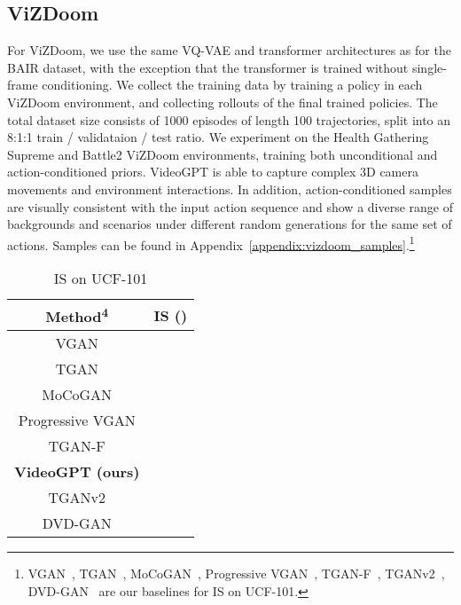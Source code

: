 \documentclass{article}
\begin{document}
\subsection{ViZDoom}
For ViZDoom, we use the same VQ-VAE and transformer architectures as for the BAIR dataset, with the exception that the transformer is trained without single-frame conditioning. We collect the training data by training a policy in each ViZDoom environment, and collecting rollouts of the final trained policies. The total dataset size consists of 1000 episodes of length 100 trajectories, split into an 8:1:1 train / validataion / test ratio. We experiment on the Health Gathering Supreme and Battle2 ViZDoom environments, training both unconditional and action-conditioned priors. VideoGPT is able to capture complex 3D camera movements and environment interactions. In addition, action-conditioned samples are visually consistent with the input action sequence and show a diverse range of backgrounds and scenarios under different random generations for the same set of actions. Samples can be found in Appendix~\ref{appendix:vizdoom_samples}.\footnote{VGAN~\citep{vondrick2016generating}, TGAN~\cite{saito2017temporal}, MoCoGAN~\citep{tulyakov2018mocogan}, Progressive VGAN~\cite{acharya2018towards}, TGAN-F~\citep{kahembwe2020lower}, TGANv2~\cite{saito2018tganv2}, DVD-GAN~\cite{clark2019adversarial} are our baselines for IS on UCF-101.}

\begin{table}[h]
            \centering
        
        \caption{IS on UCF-101}
        \label{table:ucf_is}
\begin{tabular}{@{}cc@{}}
\toprule
Method\textsuperscript{4} & IS ()                      \\ \midrule
VGAN                      &                       \\
TGAN                      &                      \\
MoCoGAN                   &                      \\
Progressive VGAN          &                      \\
TGAN-F                    & \multicolumn{1}{l}{} \\
\textbf{VideoGPT (ours)}  & \multicolumn{1}{l}{} \\
TGANv2                    & \multicolumn{1}{l}{} \\
DVD-GAN                   & \multicolumn{1}{l}{}  \\ \bottomrule
\end{tabular}
\end{table}
\end{document}
